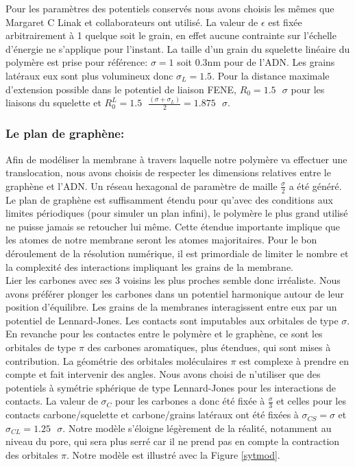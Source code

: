 \documentclass[a4paper,11pt]{article}
\begin{document}
Pour les paramètres des potentiels conservés nous avons choisis les mêmes que Margaret C Linak et collaborateurs \cite{jchem} ont utilisé. La valeur de $\epsilon$ est fixée arbitrairement à 1 quelque soit le grain, en effet aucune contrainte sur l'échelle d'énergie ne s'applique pour l'instant. La taille d'un grain du squelette linéaire du polymère est prise pour référence: $\sigma=1$ soit 0.3nm pour de l'ADN. Les grains latéraux eux sont plus volumineux donc $\sigma_{L}=1.5$. Pour la distance maximale d'extension possible dans le potentiel de liaison FENE, $R_0=1.5\text{ } \sigma$ pour les liaisons du squelette et $R_0^{L}=1.5 \text{ }\frac{(\sigma+\sigma_{L})}{2} = 1.875\text{ } \sigma$. 

\subsubsection*{Le plan de graphène:}

Afin de modéliser la membrane à travers laquelle notre polymère va effectuer une translocation, nous avons choisis de respecter les dimensions relatives  entre le graphène et l'ADN. Un réseau hexagonal de paramètre de maille $\frac{\sigma}{2}$ a été généré. Le plan de graphène est suffisamment étendu pour qu'avec des conditions aux limites périodiques (pour simuler un plan infini), le polymère le plus grand utilisé ne puisse jamais se retoucher lui même. Cette étendue importante implique que les atomes de notre membrane seront les atomes majoritaires. Pour le bon déroulement de la résolution numérique, il est primordiale de limiter le nombre et la complexité des interactions impliquant les grains de la membrane.\\
 
 Lier les carbones avec ses 3 voisins les plus proches semble donc irréaliste. Nous avons préférer plonger les carbones dans un potentiel harmonique autour de leur position d'équilibre. Les grains de la membranes interagissent entre eux par un potentiel de Lennard-Jones. Les contacts sont imputables aux orbitales de type $\sigma$. En revanche pour les contactes entre le polymère et le graphène, ce sont les orbitales de type $\pi$ des carbones aromatiques, plus étendues, qui sont mises à contribution. La géométrie des orbitales moléculaires $\pi$ est complexe à prendre en compte et fait intervenir des angles. Nous avons choisi de n'utiliser que des potentiels à symétrie sphérique de type Lennard-Jones pour les interactions de contacts. La valeur de $\sigma_C$ pour les carbones a donc été fixée à $\frac{\sigma}{3}$ et celles pour les contacts carbone/squelette et carbone/grains latéraux ont été fixées à $\sigma_{CS}= \sigma $ et $\sigma_{CL}=1.25\text{ }\sigma$. Notre modèle s'éloigne légèrement de la réalité, notamment au niveau du pore, qui sera plus serré car il ne prend pas en compte la contraction des orbitales $\pi$. Notre modèle est illustré avec la Figure \ref{sytmod}.
\end{document}
